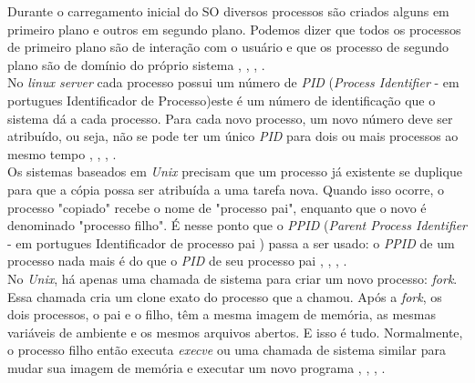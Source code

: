 Durante o carregamento inicial do SO diversos processos são criados alguns em primeiro plano e outros em segundo plano. Podemos dizer que todos os processos de primeiro plano são de interação com o usuário e que os processo de segundo plano são de domínio do próprio sistema \cite{Tanenbaum2016}, \cite{info2020}, \cite{Morimoto2011}, \cite{Man2020}.\\
No \emph{linux server} cada processo possui um número de \emph{PID} (\emph{Process Identifier} - em portugues Identificador de Processo)este é um número de identificação que o sistema dá a cada processo. Para cada novo processo, um novo número deve ser atribuído, ou seja, não se pode ter um único \emph{PID} para dois ou mais processos ao mesmo tempo \cite{Tanenbaum2016}, \cite{info2020}, \cite{Morimoto2011}, \cite{Man2020}.\\
Os sistemas baseados em \emph{Unix} precisam que um processo já existente se duplique para que a cópia possa ser atribuída a uma tarefa nova. Quando isso ocorre, o processo "copiado" recebe o nome de "processo pai", enquanto que o novo é denominado "processo filho". É nesse ponto que o \emph{PPID} (\emph{Parent Process Identifier} - em portugues Identificador de processo pai ) passa a ser usado: o \emph{PPID} de um processo nada mais é do que o \emph{PID} de seu processo pai \cite{Tanenbaum2016}, \cite{info2020}, \cite{Morimoto2011}, \cite{Man2020}.\\
No \emph{Unix}, há apenas uma chamada de sistema para criar um novo processo: \emph{fork}. Essa chamada cria um clone exato do processo que a chamou. Após a \emph{fork}, os dois processos, o pai e o filho, têm a mesma imagem de memória, as mesmas variáveis de ambiente e os mesmos arquivos abertos. E isso é tudo. Normalmente, o processo filho então executa \emph{execve} ou uma chamada de sistema similar para mudar sua imagem de memória e executar um novo programa  \cite{Tanenbaum2016}, \cite{info2020}, \cite{Morimoto2011}, \cite{Man2020}.